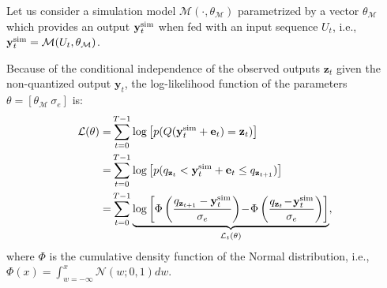 \documentclass{article}
\newcommand{\tvec}[1]{\mathbf{#1}}
\newcommand{\simul}{{\rm sim}}
\newcommand{\vv}{z}
\begin{document}
Let us consider a simulation model $\mathcal{M}(\cdot, \theta_\mathcal{M})$ parametrized by a vector $\theta_\mathcal{M}$ which provides an output   $\tvec{y}^{\simul}_t$  when fed with an input sequence $U_t$, i.e.,  $\tvec{y}^{\simul}_t = \mathcal{M}(U_t, \theta_\mathcal{M})$. 

Because of the conditional independence of the observed outputs $\tvec{\vv}_t$ given the non-quantized output
$\tvec{y}_t$, the log-likelihood function of the parameters $\theta = [\theta_\mathcal{M}\ \sigma_e]$ is: %
\begin{align} 
\label{eq:likelihood_quant}
\mathcal{L}(\theta) =  &  \sum_{t=0}^{T-1} \log \left[  p( Q(\tvec{y}^{\simul}_t + \tvec{e}_t) = \tvec{\vv}_t  )  \right] \nonumber  \\
 =  &  \sum_{t=0}^{T-1} \log \left[ p( q_{\tvec{\vv}_t} <  \tvec{y}^{\simul}_t +  \tvec{e}_t \leq q_{\tvec{\vv}_{t+1}} )  \right] \nonumber \\
=  & \sum_{t=0}^{T-1} \underset{\mathcal{L}_t(\theta)} {\underbrace{\log \left[ \Phi\left(\frac{ q_{\tvec{\vv}_{t+1}}-\tvec{y}^{\simul}_t}{\sigma_e} \right)
\!-\! \Phi\left(\frac{ q_{\tvec{\vv}_t}\!-\!\tvec{y}^{\simul}_t}{\sigma_e} \right) \right]}},  
\end{align} 
where $\Phi$ is the cumulative density function of the Normal distribution, i.e., 
$\Phi(x) = \int_{w=-\infty}^x \mathcal{N}(w; 0, 1) dw$.  

%
\end{document}
